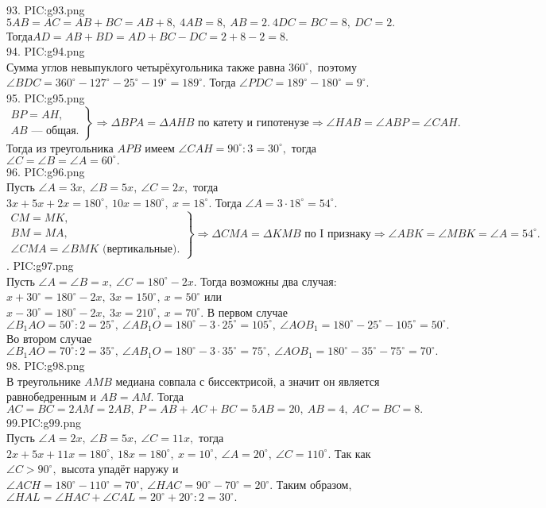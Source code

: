93. {{PIC:g93.png}}\\
$5AB=AC=AB+BC=AB+8,\ 4AB=8,\ AB=2.\ 4DC=BC=8,\ DC=2.$ Тогда$AD=AB+BD=AD+BC-DC=2+8-2=8.$\\
94. {{PIC:g94.png}}\\
Сумма углов невыпуклого четырёхугольника также равна $360^\circ,$ поэтому $\angle BDC=360^\circ-127^\circ-25^\circ-19^\circ=189^\circ.$ Тогда $\angle PDC=189^\circ-180^\circ=9^\circ.$\\
95. {{PIC:g95.png}}\\
$\left.\begin{array}{l}BP=AH,\\
AB\text{ --- общая.} \end{array}\right\}\Rightarrow \Delta BPA=\Delta AHB\text{ по катету и гипотенузе}\Rightarrow \angle HAB=\angle ABP=\angle CAH.$ Тогда из треугольника $APB$ имеем $\angle CAH=90^\circ:3=30^\circ,$ тогда $\angle C=\angle B=\angle A=60^\circ.$\\
96. {{PIC:g96.png}}\\
Пусть $\angle A=3x,\ \angle B=5x,\ \angle C=2x,$ тогда $3x+5x+2x=180^\circ,\ 10x=180^\circ,\ x=18^\circ.$ Тогда $\angle A=3\cdot18^\circ=54^\circ.$
$\left.\begin{array}{l}CM=MK,\\
BM=MA,\\
\angle CMA=\angle BMK\text{ (вертикальные).}\end{array}\right\}\Rightarrow \Delta CMA=\Delta KMB\text{ по I признаку}\Rightarrow \angle ABK=\angle MBK=\angle A=54^\circ.$\newpage
{}. {{PIC:g97.png}}\\
Пусть $\angle A=\angle B=x,\ \angle C=180^\circ-2x.$ Тогда возможны два случая: $x+30^\circ=180^\circ-2x,\ 3x=150^\circ,\ x=50^\circ$ или $x-30^\circ=180^\circ-2x,\
3x=210^\circ,\ x=70^\circ.$ В первом случае  $\angle B_1AO=50^\circ:2=25^\circ,\ \angle AB_1O=180^\circ-3\cdot25^\circ=105^\circ,\ \angle AOB_1=180^\circ-25^\circ-105^\circ=50^\circ.$ Во втором случае  $\angle B_1AO=70^\circ:2=35^\circ,\ \angle AB_1O=180^\circ-3\cdot35^\circ=75^\circ,\ \angle AOB_1=180^\circ-35^\circ-75^\circ=70^\circ.$\\
98. {{PIC:g98.png}}\\
В треугольнике $AMB$ медиана совпала с биссектрисой, а значит он является равнобедренным и $AB=AM.$ Тогда $AC=BC=2AM=2AB,\ P=AB+AC+BC=5AB=20,\ AB=4,\ AC=BC=8.$\\
99.{{PIC:g99.png}}\\
Пусть $\angle A=2x,\ \angle B=5x,\ \angle C=11x,$ тогда $2x+5x+11x=180^\circ,\ 18x=180^\circ,\ x=10^\circ,\ \angle A=20^\circ,\ \angle C=110^\circ.$ Так как $\angle C>90^\circ,$ высота упадёт наружу и  $\angle ACH=180^\circ-110^\circ=70^\circ,\ \angle HAC=90^\circ-70^\circ=20^\circ.$ Таким образом, $\angle HAL=\angle HAC+\angle CAL=20^\circ+20^\circ:2=30^\circ.$\newpage
